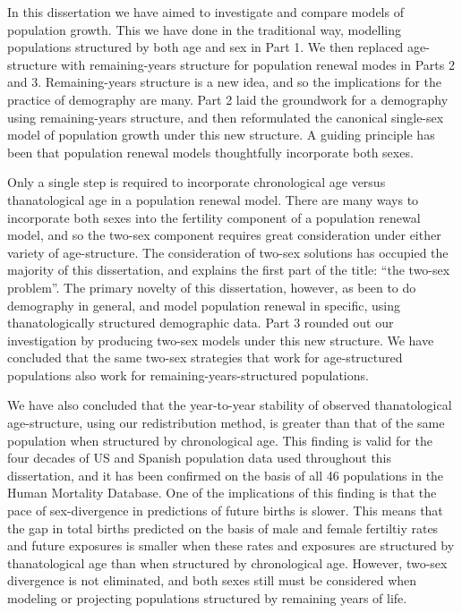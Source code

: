 
In this dissertation we have aimed to investigate and compare models of
population growth. This we have done in the traditional way, modelling populations structured by
both age and sex in Part 1. We then replaced age-structure with remaining-years
structure for population renewal modes in Parts 2 and 3. Remaining-years
structure is a new idea, and so the implications for the practice of demography are many. Part
2 laid the groundwork for a demography using remaining-years
structure, and then reformulated the canonical single-sex model of population
growth under this new structure. A guiding principle has been that
population renewal models thoughtfully incorporate both sexes. 

Only a single step is required to incorporate chronological age versus
thanatological age in a population renewal model. There are many ways to incorporate both sexes
into the fertility component of a population renewal model, and so the 
two-sex component requires great consideration under either
variety of age-structure. The consideration of two-sex solutions has occupied
the majority of this dissertation, and explains the first part of 
the title: ``the two-sex problem''. The primary
novelty of this dissertation, however, as been to do demography in general, and
model population renewal in specific, using thanatologically structured
demographic data. Part 3 rounded out our investigation by producing two-sex
models under this new structure. We have concluded that the same two-sex strategies that work for
age-structured populations also work for remaining-years-structured populations.

We have also concluded that the year-to-year stability of observed
thanatological age-structure, using our redistribution method, is
greater than that of the same population when structured by
chronological age. This finding is valid for the four decades of US and
Spanish population data used throughout this dissertation, and it has been
confirmed on the basis of all 46 populations in the Human Mortality Database.
One of the implications of this finding is that the pace of
sex-divergence in predictions of future births is slower. This means that the
gap in total births predicted on the basis of male and female fertiltiy rates
and future exposures is smaller when these rates and exposures are structured
by thanatological age than when structured by chronological age. However,
two-sex divergence is not eliminated, and both sexes still must be considered
when modeling or projecting populations structured by remaining years of life.

